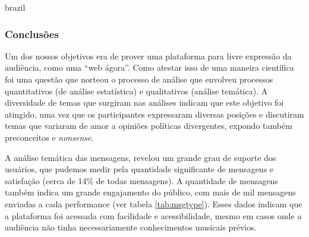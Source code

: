 \begin{otherlanguage*}{brazil}






\subsubsection{Conclusões}


Um dos nossos objetivos era de prover uma plataforma para livre expressão da audiência, como uma ``web ágora''. Como atestar isso de uma maneira científica foi uma questão que norteou o processo de análise que envolveu processos quantitativos (de análise estatística) e qualitativos (análise temática). A diversidade de temas que surgiram nas análises indicam que este objetivo foi atingido, uma vez que os participantes expressaram diversas posições e discutiram temas que variaram de amor a opiniões políticas divergentes, expondo também preconceitos e \emph{nonsense}.

A análise temática das mensagens, revelou um grande grau de suporte dos usuários, que pudemos medir pela quantidade significante de mensagens e satisfação (cerca de 14\% de todas mensagens). A quantidade de mensagens também indica um grande engajamento do público, com mais de mil mensagens enviadas a cada performance (ver tabela \ref{tab:msgtype}). Esses dados indicam que a plataforma foi acessada com facilidade e acessibilidade, mesmo em casos onde a audiência não tinha necessariamente conhecimentos musicais prévios. 


\end{otherlanguage*}
